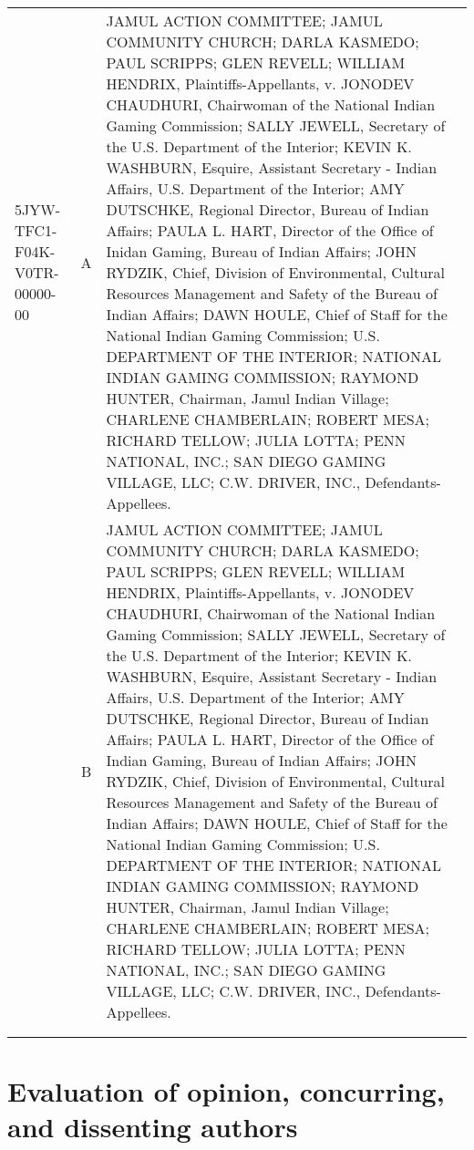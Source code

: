 \documentclass[10pt, letterpaper]{article}
\begin{document}
\begin{spacing}{1.0}
\begin{small}
\begin{longtable}[H]{lcp{4in}}
    5JYW-TFC1-F04K-V0TR-00000-00 & A & JAMUL ACTION COMMITTEE; JAMUL COMMUNITY CHURCH; DARLA KASMEDO; PAUL SCRIPPS; GLEN REVELL; WILLIAM HENDRIX, Plaintiffs-Appellants, v. JONODEV CHAUDHURI, Chairwoman of the National Indian Gaming Commission; SALLY JEWELL, Secretary of the U.S. Department of the Interior; KEVIN K. WASHBURN, Esquire, Assistant Secretary - Indian Affairs, U.S. Department of the Interior; AMY DUTSCHKE, Regional Director, Bureau of Indian Affairs; PAULA L. HART, Director of the Office of Inidan Gaming, Bureau of Indian Affairs; JOHN RYDZIK, Chief, Division of Environmental, Cultural Resources Management and Safety of the Bureau of Indian Affairs; DAWN HOULE, Chief of Staff for the National Indian Gaming Commission; U.S. DEPARTMENT OF THE INTERIOR; NATIONAL INDIAN GAMING COMMISSION; RAYMOND HUNTER, Chairman, Jamul Indian Village; CHARLENE CHAMBERLAIN; ROBERT MESA; RICHARD TELLOW; JULIA LOTTA; PENN NATIONAL, INC.; SAN DIEGO GAMING VILLAGE, LLC; C.W. DRIVER, INC., Defendants-Appellees.\\[4pt] & B & JAMUL ACTION COMMITTEE; JAMUL COMMUNITY CHURCH; DARLA KASMEDO; PAUL SCRIPPS; GLEN REVELL; WILLIAM HENDRIX, Plaintiffs-Appellants, v. JONODEV CHAUDHURI, Chairwoman of the National Indian Gaming Commission; SALLY JEWELL, Secretary of the U.S. Department of the Interior; KEVIN K. WASHBURN, Esquire, Assistant Secretary - Indian Affairs, U.S. Department of the Interior; AMY DUTSCHKE, Regional Director, Bureau of Indian Affairs; PAULA L. HART, Director of the Office of Indian Gaming, Bureau of Indian Affairs; JOHN RYDZIK, Chief, Division of Environmental, Cultural Resources Management and Safety of the Bureau of Indian Affairs; DAWN HOULE, Chief of Staff for the National Indian Gaming Commission; U.S. DEPARTMENT OF THE INTERIOR; NATIONAL INDIAN GAMING COMMISSION; RAYMOND HUNTER, Chairman, Jamul Indian Village; CHARLENE CHAMBERLAIN; ROBERT MESA; RICHARD TELLOW; JULIA LOTTA; PENN NATIONAL, INC.; SAN DIEGO GAMING VILLAGE, LLC; C.W. DRIVER, INC., Defendants-Appellees.\\[4pt]
    \hline\\
    \label{tab:diffLongName}
\end{longtable}
\end{small}


\clearpage

\section{Evaluation of opinion, concurring, and dissenting authors}\label{sec:evalOpAuthor}


\end{spacing}
\end{document}
